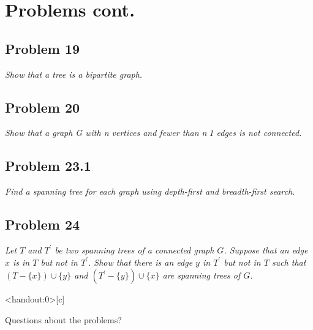\documentclass[
        ]{beamer}
\begin{document}
\section{Problems cont.}
    \subsection{Problem 19}
        \begin{frame}[c]{\subsecname}
            \emph{Show that a tree is a bipartite graph.}\\\pause
        \end{frame}



    \subsection{Problem 20}
        \begin{frame}[c]{\subsecname}
            \emph{Show that a graph G with n vertices and fewer than n􀀀1 edges is not connected.}\\\pause
        \end{frame}



    \subsection{Problem 23.1}
        \begin{frame}[c]{\subsecname}
            \emph{Find a spanning tree for each graph using depth-first and breadth-first search.}\\\pause
        \end{frame}



    \subsection{Problem 24}
        \begin{frame}[c]{\subsecname}
            \emph{Let $T$ and $T^\prime$ be two spanning trees of a connected graph $G$. Suppose that an edge $x$ is in $T$ but not in $T^\prime$. Show that there is an edge $y$ in $T^\prime$ but not in $T$ such that $( T - \{ x \} ) \cup \{ y \} $ and $(T^\prime - \{ y \} ) \cup \{ x \} $ are spanning trees of $G$.}\\\pause
        \end{frame}
    
    
    
    \begin{frame}<handout:0>[c]{\secname}
        \centerline{\Large{Questions about the problems?}}
    \end{frame}
    
    
    
\end{document}
